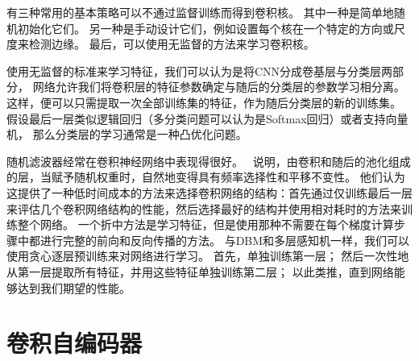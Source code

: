 有三种常用的基本策略可以不通过监督训练而得到卷积核。
其中一种是简单地随机初始化它们。
另一种是手动设计它们，例如设置每个核在一个特定的方向或尺度来检测边缘。
最后，可以使用无监督的方法来学习卷积核。\par

使用无监督的标准来学习特征，我们可以认为是将CNN分成卷基层与分类层两部分，
网络允许我们将卷积层的特征参数确定与随后的分类层的参数学习相分离。
这样，便可以只需提取一次全部训练集的特征，作为随后分类层的新的训练集。
假设最后一层类似逻辑回归（多分类问题可以认为是Softmax回归）或者支持向量机，
那么分类层的学习通常是一种凸优化问题。\par
随机滤波器经常在卷积神经网络中表现得很好。
\cite{Saxe-ICML2011}~说明，由卷积和随后的池化组成的层，当赋予随机权重时，自然地变得具有频率选择性和平移不变性。
他们认为这提供了一种低时间成本的方法来选择卷积网络的结构：首先通过仅训练最后一层来评估几个卷积网络结构的性能，然后选择最好的结构并使用相对耗时的方法来训练整个网络。
一个折中方法是学习特征，但是使用那种不需要在每个梯度计算步骤中都进行完整的前向和反向传播的方法。
与DBM和多层感知机一样，我们可以使用贪心逐层预训练来对网络进行学习。
首先，单独训练第一层；
然后一次性地从第一层提取所有特征，并用这些特征单独训练第二层；
以此类推，直到网络能够达到我们期望的性能。

\section{卷积自编码器}
